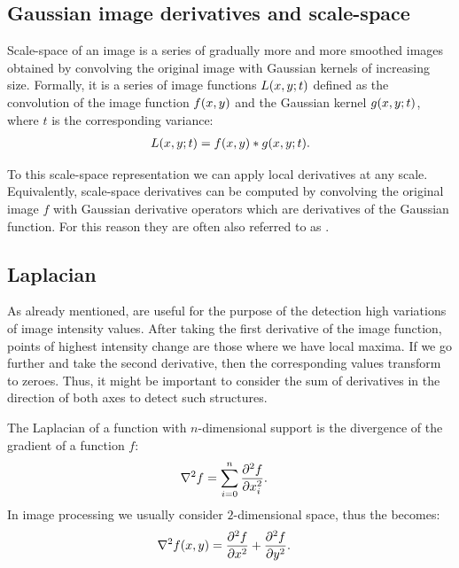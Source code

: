 \subsection{Gaussian image derivatives and scale-space}
\label{sec:gaussder}

Scale-space of an image is a series of gradually more and more smoothed images obtained by convolving the original image with Gaussian kernels of increasing size.
Formally, it is a series of image functions $L(x, y; t)$ defined as the convolution of the image function $f(x, y)$ and the Gaussian kernel $g(x, y; t)$, where $t$ is the corresponding variance: %
\begin{align*}
L(x, y; t) = f(x, y) * g(x, y; t).
\end{align*}

To this scale-space representation we can apply local derivatives at any scale.
Equivalently, scale-space derivatives can be computed by convolving the original image $f$ with Gaussian derivative operators which are derivatives of the Gaussian function.
For this reason they are often also referred to as .

\subsection{Laplacian}

As already mentioned,  are useful for the purpose of the detection high variations of image intensity values.
After taking the first derivative of the image function, points of highest intensity change are those where we have local maxima. 
If we go further and take the second derivative, then the corresponding values transform to zeroes.
Thus, it might be important to consider the sum of derivatives in the direction of both axes to detect such structures. 

\begin{definition}
The Laplacian of a function with $n$-dimensional support is the divergence of the gradient of a function $f$:
\begin{align*}
\nabla^{2}f &= \sum_{i=0}^{n} \frac{ \partial^2 f }{  \partial x_i^2  }.
\end{align*}
In image processing we usually consider $2$-dimensional space, thus the  becomes: 
\begin{align*}
\nabla ^{2}f(x, y)&=\frac{ \partial^2 f }{ \partial x^2 } + \frac{ \partial^2 f }{ \partial y^2 }.
\end{align*}
\end{definition} 

